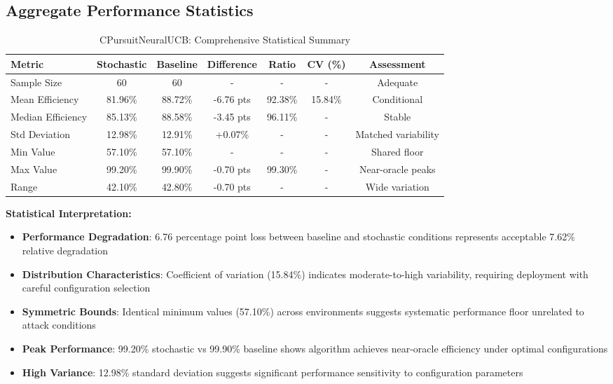 \documentclass[12pt,a4paper]{article}
\newcommand{\primarytext}[1]{\textcolor{primaryblue}{\textbf{#1}}}
\newcommand{\secondarytext}[1]{\textcolor{secondaryblue}{\textbf{#1}}}
\newcommand{\success}[1]{\textcolor{accentgreen}{\textbf{#1}}}
\newcommand{\warning}[1]{\textcolor{warningred}{\textbf{#1}}}
\begin{document}
\subsection{Aggregate Performance Statistics}

\begin{table}[H]
\centering
\caption{CPursuitNeuralUCB: Comprehensive Statistical Summary}
\label{tab:aggregate_stats}
\begin{tabular}{@{}lcccccc@{}}
\toprule
\textbf{Metric} & \textbf{Stochastic} & \textbf{Baseline} & \textbf{Difference} & \textbf{Ratio} & \textbf{CV (\%)} & \textbf{Assessment} \\
\midrule
Sample Size & 60 & 60 & - & - & - & Adequate \\
Mean Efficiency & 81.96\% & 88.72\% & -6.76 pts & 92.38\% & 15.84\% & Conditional \\
Median Efficiency & 85.13\% & 88.58\% & -3.45 pts & 96.11\% & - & Stable \\
Std Deviation & 12.98\% & 12.91\% & +0.07\% & - & - & Matched variability \\
Min Value & 57.10\% & 57.10\% & - & - & - & Shared floor \\
Max Value & 99.20\% & 99.90\% & -0.70 pts & 99.30\% & - & Near-oracle peaks \\
Range & 42.10\% & 42.80\% & -0.70 pts & - & - & Wide variation \\
\bottomrule
\end{tabular}
\end{table}

\textbf{Statistical Interpretation:}
\begin{itemize}
\item \success{Performance Degradation}: 6.76 percentage point loss between baseline and stochastic conditions represents acceptable 7.62\% relative degradation
\item \primarytext{Distribution Characteristics}: Coefficient of variation (15.84\%) indicates moderate-to-high variability, requiring deployment with careful configuration selection
\item \secondarytext{Symmetric Bounds}: Identical minimum values (57.10\%) across environments suggests systematic performance floor unrelated to attack conditions
\item \success{Peak Performance}: 99.20\% stochastic vs 99.90\% baseline shows algorithm achieves near-oracle efficiency under optimal configurations
\item \warning{High Variance}: 12.98\% standard deviation suggests significant performance sensitivity to configuration parameters
\end{itemize}
\end{document}
